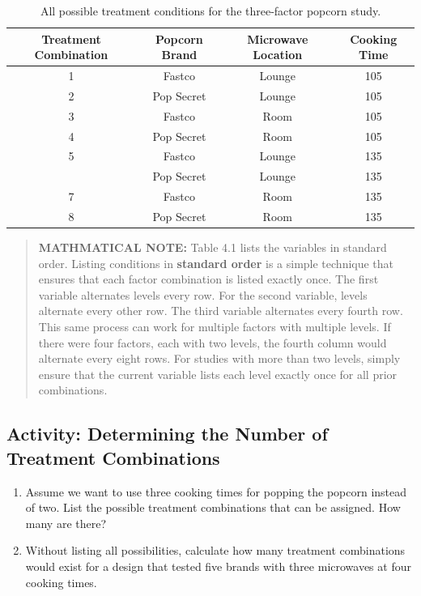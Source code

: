 \documentclass[
]{book}
\begin{document}
\begin{table}[!h]
\centering
\caption{\label{tab:tab41}All possible treatment conditions for the three-factor popcorn study.}
\centering
\begin{tabular}[t]{cccc}
\toprule
Treatment Combination & Popcorn Brand & Microwave Location & Cooking Time\\
\midrule
1 & Fastco & Lounge & 105\\
2 & Pop Secret & Lounge & 105\\
3 & Fastco & Room & 105\\
4 & Pop Secret & Room & 105\\
5 & Fastco & Lounge & 135\\
\addlinespace
6 & Pop Secret & Lounge & 135\\
7 & Fastco & Room & 135\\
8 & Pop Secret & Room & 135\\
\bottomrule
\end{tabular}
\end{table}

\begin{quote}
\textbf{MATHMATICAL NOTE:} Table 4.1 lists the variables in standard order. Listing conditions in \textbf{standard order} is a simple technique that ensures that each factor combination is listed exactly once. The first variable alternates levels every row. For the second variable, levels alternate every other row. The third variable alternates every fourth row. This same process can work for multiple factors with multiple levels. If there were four factors, each with two levels, the fourth column would alternate every eight rows. For studies with more than two levels, simply ensure that the current variable lists each level exactly once for all prior combinations.
\end{quote}

\hypertarget{activity-determining-the-number-of-treatment-combinations}{%
\subsection*{Activity: Determining the Number of Treatment Combinations}\label{activity-determining-the-number-of-treatment-combinations}}

\begin{enumerate}
\def\labelenumi{\arabic{enumi}.}
\item
  Assume we want to use three cooking times for popping the popcorn instead of two. List the possible treatment combinations that can be assigned. How many are there?
\item
  Without listing all possibilities, calculate how many treatment combinations would exist for a design that tested five brands with three microwaves at four cooking times.
\end{enumerate}
\end{document}
